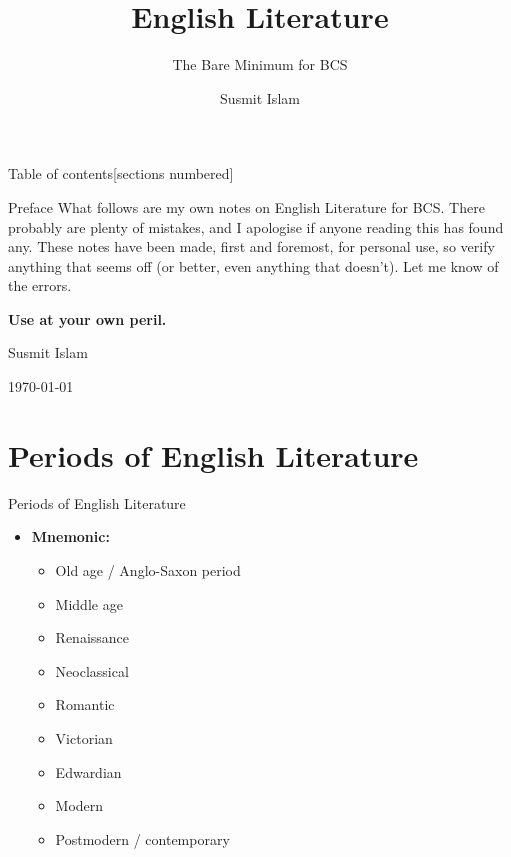 \documentclass[
  12pt,
    progressbar=frametitle]{beamer}
\title{English Literature}
\subtitle{The Bare Minimum for BCS}
\author{Susmit Islam}
\date{}
\institute{Sir Salimullah Medical College}
\providecommand{\tightlist}{%
  \setlength{\itemsep}{0pt}\setlength{\parskip}{0pt}}
\begin{document}
\frame{\titlepage}
\begin{frame}[t,allowframebreaks]
{Table of contents}[sections numbered]

\tableofcontents[hideallsubsections]
\end{frame}


\begin{frame}[allowframebreaks]
{Preface}
What follows are my own notes on English Literature for BCS. There
probably are plenty of mistakes, and I apologise if anyone reading this
has found any. These notes have been made, first and foremost, for
personal use, so verify anything that seems off (or better, even
anything that doesn't). Let me know of the errors.

\textbf{Use at your own peril.}

\hfill Susmit Islam

\hfill \today
\end{frame}

\section{Periods of English Literature}
\begin{frame}[allowframebreaks]
{Periods of English Literature}
\begin{itemize}
\tightlist
\item
  \textbf{Mnemonic:} 

  \begin{itemize}
  \tightlist
  \item
    Old age / Anglo-Saxon period
  \item
    Middle age
  \item
    Renaissance
  \item
    Neoclassical
  \item
    Romantic
  \item
    Victorian
  \item
    Edwardian
  \item
    Modern
  \item
    Postmodern / contemporary
  \end{itemize}
\end{itemize}
\end{frame}
\end{document}
